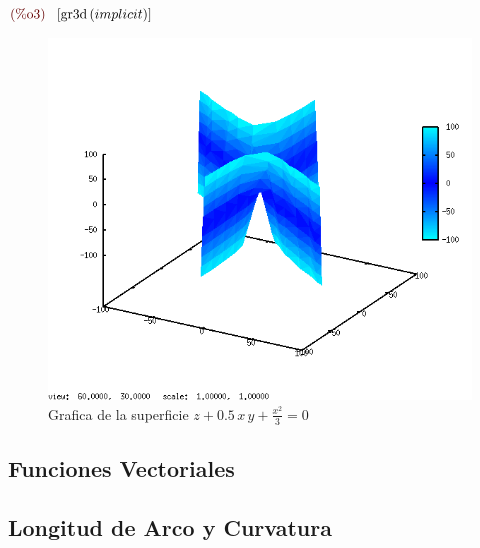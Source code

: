 \documentclass[12pt]{article}
\begin{document}
\begin{math}\displaystyle
\parbox{8ex}{\color{labelcolor}(\%o3) }
[\mathrm{gr3d}\left( implicit\right) ]
\end{math}
\begin{figure}[H]
\centering
\includegraphics[scale=0.75]{1.png}
\caption{Grafica de la superficie $z+0.5\,x\,y+\frac{{x}^{2}}{3}=0$}
\end{figure}
\subsection{Funciones Vectoriales}
\subsection{Longitud de Arco y Curvatura}
\end{document}
